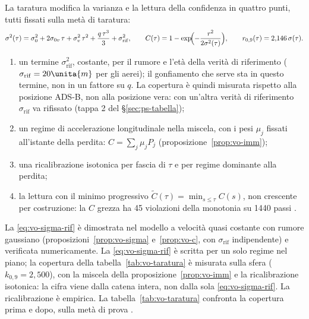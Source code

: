 La taratura modifica la varianza e la lettura della confidenza in quattro punti, tutti fissati sulla metà di taratura:
\begin{equation}\label{eq:vo-sigma-rif}
\sigma^2(\tau)=\sigma_0^2+2\sigma_{0v}\,\tau+\sigma_v^2\,\tau^2+\frac{q\,\tau^3}{3}+\sigma_{\mathrm{rif}}^2,\qquad C(\tau)=1-\exp\!\Bigl(-\frac{r^2}{2\sigma^2(\tau)}\Bigr),\qquad r_{0,9}(\tau)=2{,}146\,\sigma(\tau).
\end{equation}
\begin{enumerate}[label=\arabic*.]
\item un termine $\sigma_{\mathrm{rif}}^2$, costante, per il rumore e l'età della verità di riferimento ($\sigma_{\mathrm{rif}}=20\unita{m}$ per gli aerei); il gonfiamento che serve sta in questo termine, non in un fattore su $q$. La copertura è quindi misurata rispetto alla posizione ADS-B, non alla posizione vera: con un'altra verità di riferimento $\sigma_{\mathrm{rif}}$ va rifissato (tappa 2 del \S\ref{sec:ps-tabella});
\item un regime di accelerazione longitudinale nella miscela, con i pesi $\mu_j$ fissati all'istante della perdita: $C=\sum_j\mu_jP_j$ (proposizione~\ref{prop:vo-imm});
\item una ricalibrazione isotonica per fascia di $\tau$ e per regime dominante alla perdita;
\item la lettura con il minimo progressivo $\tilde C(\tau)=\min_{s\le\tau}C(s)$, non crescente per costruzione: la $C$ grezza ha 45 violazioni della monotonia su 1440 passi .
\end{enumerate}
La \eqref{eq:vo-sigma-rif} è dimostrata nel modello a velocità quasi costante con rumore gaussiano (proposizioni~\ref{prop:vo-sigma} e~\ref{prop:vo-c}, con $\sigma_{\mathrm{rif}}$ indipendente) e verificata numericamente. La \eqref{eq:vo-sigma-rif} è scritta per un solo regime nel piano; la copertura della tabella~\ref{tab:vo-taratura} è misurata sulla sfera ($k_{0,9}=2{,}500$), con la miscela della proposizione~\ref{prop:vo-imm} e la ricalibrazione isotonica: la cifra viene dalla catena intera, non dalla sola \eqref{eq:vo-sigma-rif}. La ricalibrazione è empirica. La tabella~\ref{tab:vo-taratura} confronta la copertura prima e dopo, sulla metà di prova .

